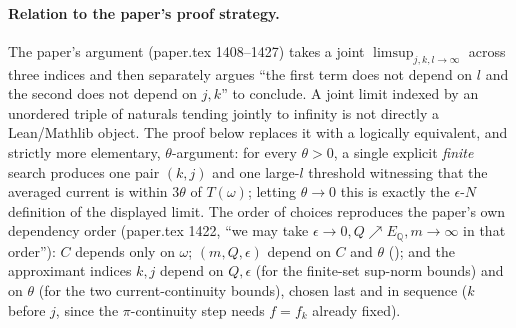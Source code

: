 \begin{lemma}
  \paragraph{Relation to the paper's proof strategy.} The paper's argument (paper.tex 1408--1427)
  takes a joint $\limsup_{j,k,l\to\infty}$ across three indices and then separately argues ``the
  first term does not depend on $l$ and the second does not depend on $j,k$'' to conclude. A joint
  limit indexed by an unordered triple of naturals tending jointly to infinity is not directly a
  Lean/Mathlib object. The proof below replaces it with a logically equivalent, and strictly more
  elementary, $\theta$-argument: for every $\theta>0$, a single explicit \emph{finite} search
  produces one pair $(k,j)$ and one large-$l$ threshold witnessing that the averaged current is
  within $3\theta$ of $T(\omega)$; letting $\theta\to0$ this is exactly the $\epsilon$-$N$
  definition of the displayed limit. The order of choices reproduces the paper's own dependency
  order (paper.tex 1422, ``we may take $\epsilon\to0,Q\nearrow E_{\mathbb{Q}},m\to\infty$ in that
  order''): $C$ depends only on $\omega$; $(m,Q,\epsilon)$ depend on $C$ and $\theta$
  (); and the approximant indices $k,j$ depend on $Q,\epsilon$ (for the
  finite-set sup-norm bounds) and on $\theta$ (for the two current-continuity bounds), chosen last
  and in sequence ($k$ before $j$, since the $\pi$-continuity step needs $f=f_k$ already fixed).
\end{lemma}
